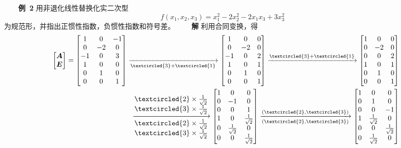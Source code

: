 \documentclass[compress,mathserif,cjk]{beamer}
\theoremstyle{remark}
\numberwithin{equation}{section}
\newcommand{\hei}{\bf}      %
\begin{document}
\begin{CJK}{UTF8}{gbsn}
\begin{frame}\small
\ \ \ \ {\hei 例~2} 用非退化线性替换化实二次型
$$f(x_1,x_2,x_3)=x_1^2-2x_2^2-2x_1x_3+3x_3^2$$
为规范形，并指出正惯性指数，负惯性指数和符号差。
\pause\vskip 5pt
\ \ \ \ {\hei 解} 利用合同变换，得
\begin{eqnarray*}
&&\left[\begin{matrix}\bm A\\\bm E\end{matrix}\right]=\left[\begin{matrix}1&0&-1\\0&-2&0\\-1&0&3\\1&0&0\\0&1&0\\0&0&1\end{matrix}\right]
\xrightarrow[\textcircled{\scriptsize 3}+\textcircled{\scriptsize 1}]{}\left[\begin{matrix}1&0&0\\0&-2&0\\-1&0&2\\1&0&1\\0&1&0\\0&0&1\end{matrix}\right]
\xrightarrow[]{\textcircled{\scriptsize 3}+\textcircled{\scriptsize 1}}\left[\begin{matrix}1&0&0\\0&-2&0\\0&0&2\\1&0&1\\0&1&0\\0&0&1\end{matrix}\right]\\
&&\xrightarrow[\begin{matrix}\textcircled{\scriptsize 2}\times\frac{1}{\sqrt2}\\\textcircled{\scriptsize 3}\times\frac{1}{\sqrt2}\end{matrix}]{\begin{matrix}\textcircled{\scriptsize 2}\times\frac{1}{\sqrt2}\\\textcircled{\scriptsize 3}\times\frac{1}{\sqrt2}\end{matrix}}
\left[\begin{matrix}1&0&0\\0&-1&0\\0&0&1\\1&0&\frac{1}{\sqrt2}\\0&\frac{1}{\sqrt2}&0\\0&0&\frac{1}{\sqrt2}\end{matrix}\right]
\xrightarrow[(\textcircled{\scriptsize 2},\textcircled{\scriptsize 3})]{(\textcircled{\scriptsize 2},\textcircled{\scriptsize 3})}
\left[\begin{matrix}1&0&0\\0&1&0\\0&0&-1\\1&\frac{1}{\sqrt2}&0\\0&0&\frac{1}{\sqrt2}\\0&\frac{1}{\sqrt2}&0\end{matrix}\right]
\end{eqnarray*}
\end{frame}


\end{CJK}
\end{document}
